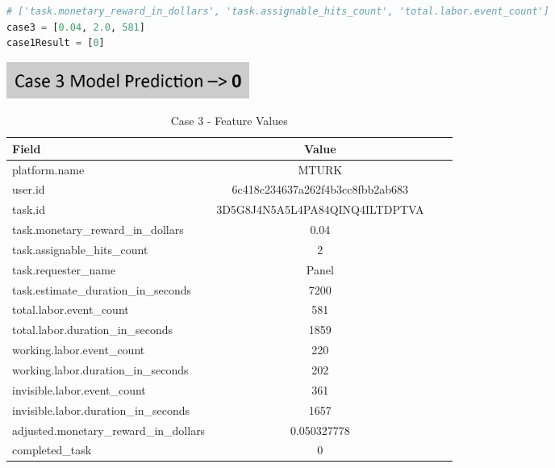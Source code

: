 \documentclass[11pt]{article}
\begin{document}
\begin{lstlisting}[language=Python]
# ['task.monetary_reward_in_dollars', 'task.assignable_hits_count', 'total.labor.event_count']
case3 = [0.04, 2.0, 581]
case1Result = [0]
\end{lstlisting}

\includegraphics[width=0.35\textwidth, center]{figures/case-3-model-prediction}

\begin{table}[hbt!]
   \small
   \centering
   \begin{tabular}{lccr}
   \hline
   \textbf{Field} & \textbf{Value} \\
   \hline
   platform.name & MTURK \\
   user.id & 6c418c234637a262f4b3cc8fbb2ab683 \\
   task.id & 3D5G8J4N5A5L4PA84QINQ4ILTDPTVA \\
   task.monetary\_reward\_in\_dollars & 0.04 \\
   task.assignable\_hits\_count & 2 \\
   task.requester\_name & Panel \\
   task.estimate\_duration\_in\_seconds & 7200 \\
   total.labor.event\_count & 581 \\
   total.labor.duration\_in\_seconds & 1859 \\
   working.labor.event\_count & 220 \\
   working.labor.duration\_in\_seconds & 202 \\
   invisible.labor.event\_count & 361 \\
   invisible.labor.duration\_in\_seconds & 1657 \\
   adjusted.monetary\_reward\_in\_dollars & 0.050327778 \\
   completed\_task & 0 \\
   \hline
   \end{tabular}
   \caption{Case 3 - Feature Values} 
\end{table}

\end{document}

